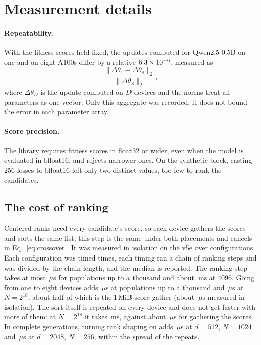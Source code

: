 
\section{Measurement details}
\label{sec:implementation}

\paragraph{Repeatability.} With the fitness scores held fixed, the updates computed for
Qwen2.5-0.5B on one and on eight A100s differ by a relative $6.3\times10^{-6}$, measured as
\[
  \frac{\lVert\Delta\theta_1-\Delta\theta_8\rVert_2}
       {\lVert\Delta\theta_8\rVert_2},
\]
where $\Delta\theta_D$ is the update computed on $D$ devices and the norms treat all
parameters as one vector. Only this aggregate was recorded; it does not bound the error in
each parameter array.

\paragraph{Score precision.} The library requires fitness scores in float32 or wider,
even when the model is evaluated in bfloat16, and rejects narrower ones. On the synthetic
block, casting 256 losses to bfloat16 left only two distinct values, too few to rank the
candidates.

\subsection{The cost of ranking}
\label{sec:barrier}

Centered ranks need every candidate's score, so each device gathers the scores and sorts the
same list; this step is the same under both placements and cancels in Eq.~\ref{eq:crossover}.
It was measured in isolation on the v5e over \RankBenchConfigs{} configurations. Each
configuration was timed \RankBenchRepeats{} times, each timing ran a chain of
\RankBenchChain{} ranking steps and was divided by the chain length, and the median is
reported. The ranking step takes at most \RankStepSmallMax\,$\mu$s for populations up to a
thousand and about \RankStepMid\,ms at 4096. Going from one to eight devices adds
\RankAddedSmall\,$\mu$s at populations up to a thousand and \RankAddedMax\,$\mu$s at
$N=2^{18}$, about half of which is the 1\,MiB score gather (about \RankGatherIsolated\,$\mu$s
measured in isolation). The sort itself is repeated on every device and does not get faster
with more of them: at $N=2^{18}$ it takes \RankSortMax\,ms, against about
\RankGatherIsolated\,$\mu$s for gathering the scores. In complete generations, turning rank
shaping on adds \RankContextSmall\,$\mu$s at $d=512$, $N=1024$ and \RankContextLarge\,$\mu$s
at $d=2048$, $N=256$, within the spread of the repeats.

